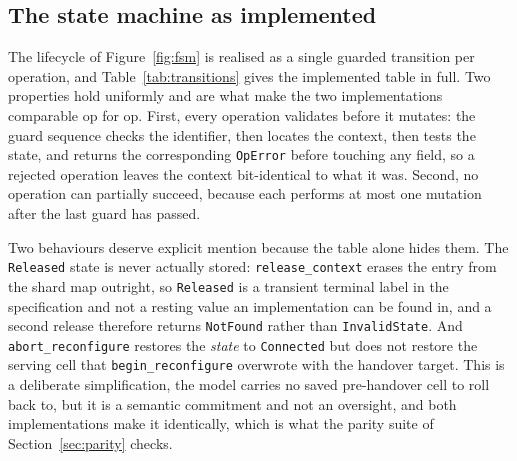 \documentclass[english,twoside,openright,a4paper,censored,csm,software-track-2020]{HYthesisML}
\begin{document}
\subsection{The state machine as implemented}
The lifecycle of Figure~\ref{fig:fsm} is realised as a single guarded transition per
operation, and Table~\ref{tab:transitions} gives the implemented table in full. Two properties
hold uniformly and are what make the two implementations comparable op for op. First, every
operation validates before it mutates: the guard sequence checks the identifier, then locates
the context, then tests the state, and returns the corresponding \texttt{OpError} before
touching any field, so a rejected operation leaves the context bit-identical to what it was.
Second, no operation can partially succeed, because each performs at most one mutation after
the last guard has passed.

Two behaviours deserve explicit mention because the table alone hides them. The
\texttt{Released} state is never actually stored: \texttt{release\_context} erases the entry
from the shard map outright, so \texttt{Released} is a transient terminal label in the
specification and not a resting value an implementation can be found in, and a second
release therefore returns \texttt{NotFound} rather than \texttt{InvalidState}.
And \texttt{abort\_reconfigure} restores the \emph{state} to \texttt{Connected} but does not
restore the serving cell that \texttt{begin\_reconfigure} overwrote with the handover target.
This is a deliberate simplification, the model carries no saved pre-handover cell to roll back
to, but it is a semantic commitment and not an oversight, and both implementations make it
identically, which is what the parity suite of Section~\ref{sec:parity} checks.
\end{document}

